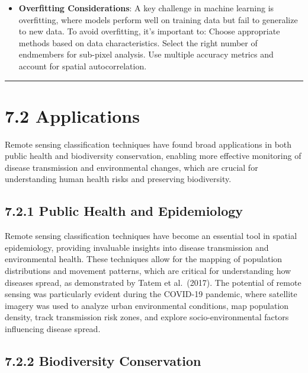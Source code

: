 \documentclass[
  letterpaper,
  DIV=11,
  numbers=noendperiod]{scrreprt}
\providecommand{\tightlist}{%
  \setlength{\itemsep}{0pt}\setlength{\parskip}{0pt}}\usepackage{longtable,booktabs,array}
\begin{document}
\begin{itemize}
\tightlist
\item
  \textbf{Overfitting Considerations}: A key challenge in machine
  learning is overfitting, where models perform well on training data
  but fail to generalize to new data. To avoid overfitting, it's
  important to: Choose appropriate methods based on data
  characteristics. Select the right number of endmembers for sub-pixel
  analysis. Use multiple accuracy metrics and account for spatial
  autocorrelation.
\end{itemize}

\begin{center}\rule{0.5\linewidth}{0.5pt}\end{center}

\section{7.2 Applications}\label{applications-4}

Remote sensing classification techniques have found broad applications
in both public health and biodiversity conservation, enabling more
effective monitoring of disease transmission and environmental changes,
which are crucial for understanding human health risks and preserving
biodiversity.

\subsection{7.2.1 Public Health and
Epidemiology}\label{public-health-and-epidemiology}

Remote sensing classification techniques have become an essential tool
in spatial epidemiology, providing invaluable insights into disease
transmission and environmental health. These techniques allow for the
mapping of population distributions and movement patterns, which are
critical for understanding how diseases spread, as demonstrated by Tatem
et al.~(2017). The potential of remote sensing was particularly evident
during the COVID-19 pandemic, where satellite imagery was used to
analyze urban environmental conditions, map population density, track
transmission risk zones, and explore socio-environmental factors
influencing disease spread.

\subsection{7.2.2 Biodiversity
Conservation}\label{biodiversity-conservation}
\end{document}
